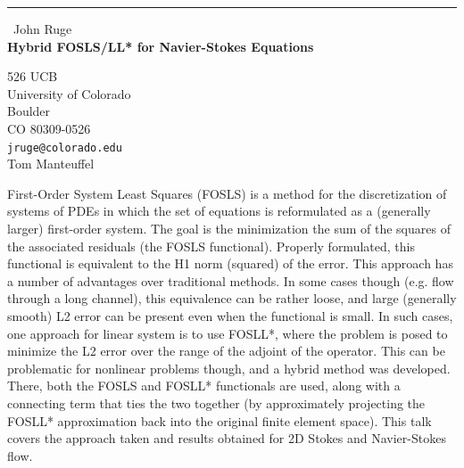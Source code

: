 \documentclass{report}
\begin{document}
\begin{center}
\rule{6in}{1pt} \
{\large John Ruge \\
{\bf Hybrid FOSLS/LL* for Navier-Stokes Equations}}

526 UCB \\ University of Colorado \\ Boulder \\ CO 80309-0526
\\
{\tt jruge@colorado.edu}\\
Tom Manteuffel\end{center}

First-Order System Least Squares (FOSLS) is a method for the
discretization of systems of PDEs in which the set of equations is
reformulated as a (generally larger) first-order system. The goal is the
minimization the sum of the squares of the associated residuals (the
FOSLS functional). Properly formulated, this functional is equivalent to
the H1 norm (squared) of the error. This approach has a number of
advantages over traditional methods. In some cases though (e.g. flow
through a long channel), this equivalence can be rather loose, and large
(generally smooth) L2 error can be present even when the functional is
small. In such cases, one approach for linear system is to use FOSLL*,
where the problem is posed to minimize the L2 error over the range of the
adjoint of the operator. This can be problematic for nonlinear problems
though, and a hybrid method was developed. There, both the FOSLS and
FOSLL* functionals are used, along with a connecting term that ties the
two together (by approximately projecting the FOSLL* approximation back
into the original finite element space). This talk covers the approach
taken and results obtained for 2D Stokes and Navier-Stokes flow.
~
\end{document}
